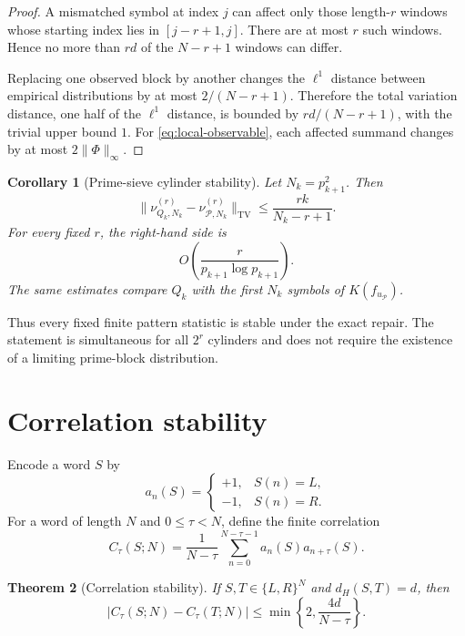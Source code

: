 \documentclass[11pt]{article}
\newtheorem{theorem}{Theorem}[section]
\newtheorem{corollary}[theorem]{Corollary}
\theoremstyle{definition}
\theoremstyle{remark}
\newcommand{\cP}{\mathcal{P}}
\newcommand{\uP}{u_{\mathcal P}}
\newcommand{\TV}{\mathrm{TV}}
\begin{document}
\begin{proof}
A mismatched symbol at index $j$ can affect only those length-$r$ windows whose starting index lies in $[j-r+1,j]$.  There are at most $r$ such windows.  Hence no more than $rd$ of the $N-r+1$ windows can differ.

Replacing one observed block by another changes the $\ell^1$ distance between empirical distributions by at most $2/(N-r+1)$.  Therefore the total variation distance, one half of the $\ell^1$ distance, is bounded by $rd/(N-r+1)$, with the trivial upper bound $1$.  For \eqref{eq:local-observable}, each affected summand changes by at most $2\|\Phi\|_\infty$.
\end{proof}

\begin{corollary}[Prime-sieve cylinder stability]\label{cor:prime-blocks}
Let $N_k=p_{k+1}^2$.  Then
\begin{equation}\label{eq:prime-block-bound}
    \bigl\|\nu_{Q_k,N_k}^{(r)}-\nu_{\cP,N_k}^{(r)}\bigr\|_{\TV}
    \le\frac{rk}{N_k-r+1}.
\end{equation}
For every fixed $r$, the right-hand side is
\[
    O\!\left(\frac{r}{p_{k+1}\log p_{k+1}}\right).
\]
The same estimates compare $Q_k$ with the first $N_k$ symbols of $K(f_{\uP})$.
\end{corollary}

Thus every fixed finite pattern statistic is stable under the exact repair.  The statement is simultaneous for all $2^r$ cylinders and does not require the existence of a limiting prime-block distribution.

\section{Correlation stability}

Encode a word $S$ by
\begin{equation}\label{eq:pm-encoding}
    a_n(S)=
    \begin{cases}
        +1,&S(n)=L,\\
        -1,&S(n)=R.
    \end{cases}
\end{equation}
For a word of length $N$ and $0\le\tau<N$, define the finite correlation
\begin{equation}\label{eq:correlation}
    C_\tau(S;N)
    =\frac{1}{N-\tau}
      \sum_{n=0}^{N-\tau-1}a_n(S)a_{n+\tau}(S).
\end{equation}

\begin{theorem}[Correlation stability]\label{thm:correlation-stability}
If $S,T\in\{L,R\}^N$ and $d_H(S,T)=d$, then
\begin{equation}\label{eq:correlation-bound}
    |C_\tau(S;N)-C_\tau(T;N)|
    \le\min\left\{2,\frac{4d}{N-\tau}\right\}.
\end{equation}
\end{theorem}
\end{document}
